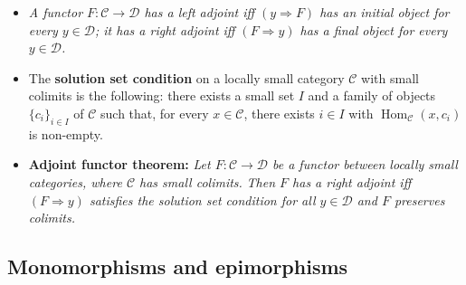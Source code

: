 \documentclass[10pt]{article}
\newcommand{\ccat}{\mathcal{C}}
\newcommand{\dcat}{\mathcal{D}}
\newcommand{\nt}{\Rightarrow}
\DeclareMathOperator{\Hom}{Hom}
\begin{document}
                \begin{itemize}
                    \item \emph{A functor $F\colon\ccat\to\dcat$ has a \emph{left adjoint} iff $(y\nt F)$ has an initial object for every $y\in\dcat$; it has a \emph{right adjoint} iff $(F\nt y)$ has a final object for every $y\in\dcat$.}
                    \item The \textbf{solution set condition} on a locally small category $\ccat$ with small colimits is the following: there exists a small set $I$ and a family of objects $\{c_i\}_{i\in I}$ of $\ccat$ such that, for every $x\in\ccat$, there exists $i\in I$ with $\Hom_\ccat(x,c_i)$ is non-empty.
                    \item \textbf{Adjoint functor theorem:} \emph{Let $F\colon\ccat\to\dcat$ be a functor between locally small categories, where $\ccat$ has small colimits.}
                        \emph{Then $F$ has a \emph{right adjoint} iff $(F\nt y)$ satisfies the solution set condition for all $y\in\dcat$ and $F$ preserves colimits.}
                \end{itemize}

        \subsection{Monomorphisms and epimorphisms}
\end{document}
